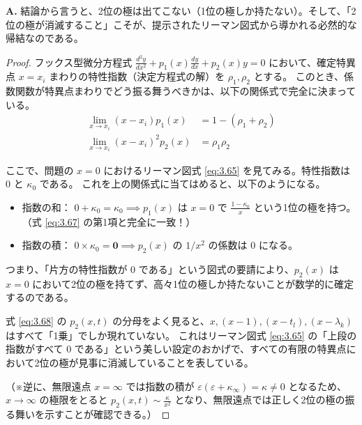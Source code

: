 \begin{Q}[【鋭い疑問】式 \eqref{eq:3.68} の $p_2(x,t)$ において、たとえば $x=0$ で「2位の極（$1/x^2$）」が出てくるべきではないのか？なぜ分母は1乗の $x$ なのか？]
\textbf{A.} 結論から言うと、2位の極は出てこない（1位の極しか持たない）。そして、「2位の極が消滅すること」こそが、提示されたリーマン図式から導かれる必然的な帰結なのである。

\begin{proof}
フックス型微分方程式 $\frac{d^2y}{dx^2} + p_1(x)\frac{dy}{dx} + p_2(x)y = 0$ において、確定特異点 $x=x_i$ まわりの特性指数（決定方程式の解）を $\rho_1, \rho_2$ とする。
このとき、係数関数が特異点まわりでどう振る舞うべきかは、以下の関係式で完全に決まっている。
\begin{align*}
\lim_{x \to x_i} (x-x_i) p_1(x) &= 1 - (\rho_1 + \rho_2) \\
\lim_{x \to x_i} (x-x_i)^2 p_2(x) &= \rho_1 \rho_2
\end{align*}

ここで、問題の $x=0$ におけるリーマン図式 \eqref{eq:3.65} を見てみる。特性指数は $0$ と $\kappa_0$ である。
これを上の関係式に当てはめると、以下のようになる。
\begin{itemize}
    \item 指数の和： $0 + \kappa_0 = \kappa_0 \implies p_1(x)$ は $x=0$ で $\frac{1-\kappa_0}{x}$ という1位の極を持つ。（式 \eqref{eq:3.67} の第1項と完全に一致！）
    \item 指数の積： $0 \times \kappa_0 = \mathbf{0} \implies p_2(x)$ の $1/x^2$ の係数は $0$ になる。
\end{itemize}
つまり、「片方の特性指数が $0$ である」という図式の要請により、$p_2(x)$ は $x=0$ において2位の極を持てず、高々1位の極しか持たないことが数学的に確定するのである。

式 \eqref{eq:3.68} の $p_2(x,t)$ の分母をよく見ると、$x, (x-1), (x-t_l), (x-\lambda_k)$ はすべて「1乗」でしか現れていない。
これはリーマン図式 \eqref{eq:3.65} の「上段の指数がすべて $0$ である」という美しい設定のおかげで、すべての有限の特異点において2位の極が見事に消滅していることを表している。

（※逆に、無限遠点 $x=\infty$ では指数の積が $\varepsilon(\varepsilon+\kappa_\infty) = \kappa \neq 0$ となるため、$x \to \infty$ の極限をとると $p_2(x,t) \sim \frac{\kappa}{x^2}$ となり、無限遠点では正しく2位の極の振る舞いを示すことが確認できる。）
\end{proof}
\end{Q}

